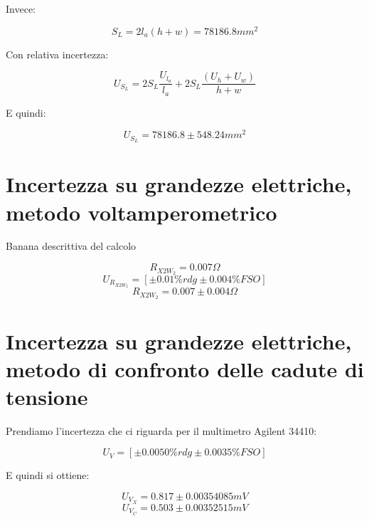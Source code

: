\documentclass[a4paper]{article}
\begin{document}
Invece:
\begin{Large} 
	\begin{equation}
		S_L= 2l_a(h+w) = 78186.8 mm^2
	 \end{equation}
\end{Large}
Con relativa incertezza:
\begin{Large} 
	\begin{equation}
		U_{S_L} =2S_L\frac{U_{l_a}}{l_a}+2S_L\frac{(U_h+U_w)}{h+w}
	 \end{equation}
\end{Large}
E quindi: 
\begin{Large} 
	\begin{equation}
		U_{S_L} =78186.8\pm 548.24mm^2
	 \end{equation}
\end{Large}

\section {Incertezza su grandezze elettriche, metodo voltamperometrico}

Banana descrittiva del calcolo 
\begin{Large}
	\begin{equation}
		R_{X2W_{2}} = 0.007 \Omega
	 \end{equation}
	\begin{equation}
		U_{R_{X2W_{2}}} = [\pm 0.01\%rdg \pm 0.004\% FSO]
	 \end{equation}
	 \begin{equation}
		R_{X2W_{2}} = 0.007 \pm 0.004 \Omega
	 \end{equation}
\end{Large}

\section {Incertezza su grandezze elettriche, metodo di confronto delle cadute di tensione}

Prendiamo l'incertezza che ci riguarda per il multimetro Agilent 34410:

\begin{Large} 
	\begin{equation}
		U_{V} = [\pm 0.0050\%rdg \pm 0.0035\% FSO]
	 \end{equation}
\end{Large}
E quindi si ottiene:
\begin{Large} 
	\begin{equation}
		U_{V_X} = 0.817 \pm 0.00354085 mV
	 \end{equation}
	 \begin{equation}
		U_{V_C} = 0.503 \pm 0.00352515 mV
	 \end{equation}
\end{Large}
\end{document}
